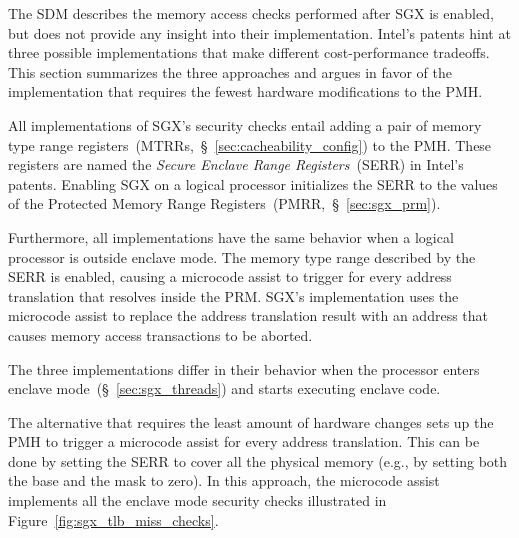 \label{sec:sgx_pmh_hardware}


The SDM describes the memory access checks performed after SGX is enabled, but
does not provide any insight into their implementation. Intel's patents hint at
three possible implementations that make different cost-performance tradeoffs.
This section summarizes the three approaches and argues in favor of the
implementation that requires the fewest hardware modifications to the PMH.

All implementations of SGX's security checks entail adding a pair of memory
type range registers~(MTRRs,~\S~\ref{sec:cacheability_config}) to the PMH.
These registers are named the \textit{Secure Enclave Range Registers}~(SERR)
in Intel's patents.  Enabling SGX on a logical processor initializes the SERR
to the values of the Protected Memory Range
Registers~(PMRR,~\S~\ref{sec:sgx_prm}).

Furthermore, all implementations have the same behavior when a logical
processor is outside enclave mode. The memory type range described by the SERR
is enabled, causing a microcode assist to trigger for every address translation
that resolves inside the PRM. SGX's implementation uses the microcode assist to
replace the address translation result with an address that causes memory
access transactions to be aborted.

The three implementations differ in their behavior when the processor enters
enclave mode~(\S~\ref{sec:sgx_threads}) and starts executing enclave code.

The alternative that requires the least amount of hardware changes sets up the
PMH to trigger a microcode assist for every address translation. This can be
done by setting the SERR to cover all the physical memory (e.g., by setting
both the base and the mask to zero). In this approach, the microcode assist
implements all the enclave mode security checks illustrated in
Figure~\ref{fig:sgx_tlb_miss_checks}.

